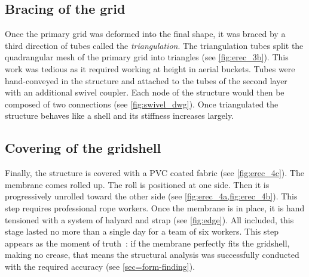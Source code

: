 {{{			
		}
	}
}

\subsection{Bracing of the grid}
Once the primary grid was deformed into the final shape, it was braced by a third direction of tubes called the \emph{triangulation}. The triangulation tubes split the quadrangular mesh of the primary grid into triangles (see \cref{fig:erec_3b}). This work was tedious as it required working at height in aerial buckets. Tubes were hand-conveyed in the structure and attached to the tubes of the second layer with an additional swivel coupler. Each node of the structure would then be composed of two connections (see \cref{fig:swivel_dwg}). Once triangulated the structure behaves like a shell and its stiffness increases largely.


\subsection{Covering of the gridshell}
Finally, the structure is covered with a PVC coated fabric (see \cref{fig:erec_4c}). The membrane comes rolled up. The roll is positioned at one side. Then it is progressively unrolled toward the other side (see \cref{fig:erec_4a,fig:erec_4b}). This step requires professional rope workers. Once the membrane is in place, it is hand tensioned with a system of halyard and strap (see \cref{fig:edge}). All included, this stage lasted no more than a single day for a team of six workers. This step appears as the moment of truth~: if the membrane perfectly fits the gridshell, making no crease, that means the structural analysis was successfully conducted with the required accuracy (see \cref{sec=form-finding}).

